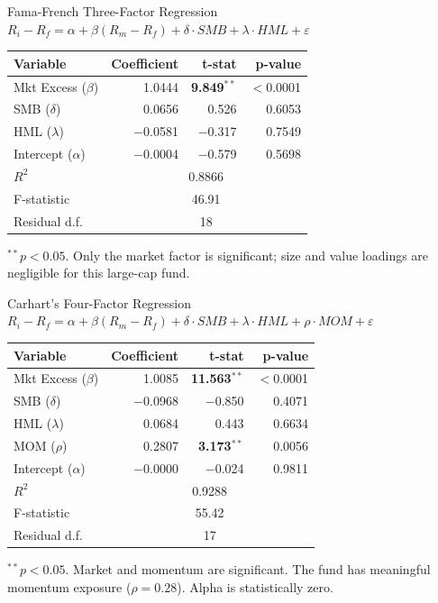 \documentclass[11pt, aspectratio=43]{beamer}
\begin{document}
\begin{frame}{Fama-French Three-Factor Regression}
\centering
\small
$R_i - R_f = \alpha + \beta(R_m - R_f) + \delta \cdot SMB + \lambda \cdot HML + \varepsilon$

\vspace{0.5em}

\begin{tabular}{l r r r}
\toprule
\textbf{Variable} & \textbf{Coefficient} & \textbf{t-stat} & \textbf{p-value} \\
\midrule
Mkt Excess ($\beta$) & 1.0444 & \textbf{9.849}$^{**}$ & $<$0.0001 \\
SMB ($\delta$) & 0.0656 & 0.526 & 0.6053 \\
HML ($\lambda$) & $-$0.0581 & $-$0.317 & 0.7549 \\
Intercept ($\alpha$) & $-$0.0004 & $-$0.579 & 0.5698 \\
\midrule
$R^2$ & \multicolumn{3}{c}{0.8866} \\
F-statistic & \multicolumn{3}{c}{46.91} \\
Residual d.f. & \multicolumn{3}{c}{18} \\
\bottomrule
\end{tabular}

\vspace{0.5em}
\footnotesize
$^{**}p < 0.05$. Only the market factor is significant; size and value loadings are negligible for this large-cap fund.
\end{frame}


\begin{frame}{Carhart's Four-Factor Regression}
\centering
\small
$R_i - R_f = \alpha + \beta(R_m - R_f) + \delta \cdot SMB + \lambda \cdot HML + \rho \cdot MOM + \varepsilon$

\vspace{0.5em}

\begin{tabular}{l r r r}
\toprule
\textbf{Variable} & \textbf{Coefficient} & \textbf{t-stat} & \textbf{p-value} \\
\midrule
Mkt Excess ($\beta$) & 1.0085 & \textbf{11.563}$^{**}$ & $<$0.0001 \\
SMB ($\delta$) & $-$0.0968 & $-$0.850 & 0.4071 \\
HML ($\lambda$) & 0.0684 & 0.443 & 0.6634 \\
MOM ($\rho$) & 0.2807 & \textbf{3.173}$^{**}$ & 0.0056 \\
Intercept ($\alpha$) & $-$0.0000 & $-$0.024 & 0.9811 \\
\midrule
$R^2$ & \multicolumn{3}{c}{0.9288} \\
F-statistic & \multicolumn{3}{c}{55.42} \\
Residual d.f. & \multicolumn{3}{c}{17} \\
\bottomrule
\end{tabular}

\vspace{0.5em}
\footnotesize
$^{**}p < 0.05$. Market and momentum are significant. The fund has meaningful momentum exposure ($\rho = 0.28$). Alpha is statistically zero.
\end{frame}
\end{document}
